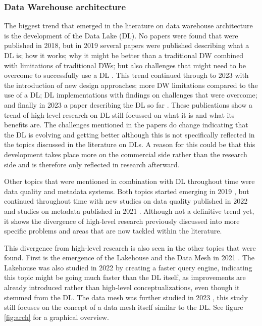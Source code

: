 \documentclass[11pt]{article}
\begin{document}
\subsubsection{Data Warehouse architecture}
\label{results:trends:architecture}
The biggest trend that emerged in the literature on data warehouse architecture is the development of the Data Lake (DL). No papers were found that were published in 2018, but in 2019 several papers were published describing what a DL is; how it works; why it might be better than a traditional DW combined with limitations of traditional DWs; but also challenges that might need to be overcome to successfully use a DL \cite{Ravat2019304, Giebler2019179, Kachaoui2019}. This trend continued through to 2023 with the introduction of new design approaches; more DW limitations compared to the use of a DL; DL implementations with findings on challenges that were overcome; and finally in 2023 a paper describing the DL so far \cite{Liu2020, Chen2022405, Li2023, Singh2022530, Schering2022783, Oukhouya2023332}. These publications show a trend of high-level research on DL still focussed on what it is and what its benefits are. The challenges mentioned in the papers do change indicating that the DL is evolving and getting better although this is not specifically reflected in the topics discussed in the literature on DLs. A reason for this could be that this development takes place more on the commercial side rather than the research side and is therefore only reflected in research afterward.

Other topics that were mentioned in combination with DL throughout time were data quality and metadata systems. Both topics started emerging in 2019 \cite{Sawadogo2019440, Sawadogo2019558, Derakhshannia2019302}, but continued throughout time with new studies on data quality published in 2022 \cite{Azeroual20223} and studies on metadata published in 2021 \cite{Sawadogo202188}. Although not a definitive trend yet, it shows the divergence of high-level research previously discussed into more specific problems and areas that are now tackled within the literature. 

This divergence from high-level research is also seen in the other topics that were found. First is the emergence of the Lakehouse and the Data Mesh in 2021 \cite{Machado2021263, Orescanin20211242}. The Lakehouse was also studied in 2022 \cite{Behm20222326} by creating a faster query engine, indicating this topic might be going much faster than the DL itself, as improvements are already introduced rather than high-level conceptualizations, even though it stemmed from the DL. The data mesh was further studied in 2023 \cite{Vlasiuk2023183}, this study still focuses on the concept of a data mesh itself similar to the DL. See figure \ref{fig:arch} for a graphical overview. \\
\end{document}
